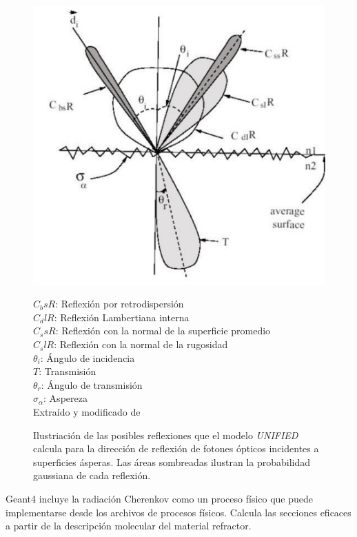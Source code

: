 \documentclass{book}
\begin{document}
\begin{figure}[h] %
\begin{center}
 \includegraphics[width = 0.5\linewidth]{UNIFIED.png}
 
 $C_bsR$: Reflexi\'on por retrodispersi\'on\\
 $C_dlR$: Reflexi\'on Lambertiana interna\\
 $C_ssR$: Reflexi\'on con la normal de la superficie promedio\\
 $C_slR$: Reflexi\'on con la normal de la rugosidad\\
 $\theta_i$: \'Angulo de incidencia\\
 $T$: Transmisi\'on\\
 $\theta_r$: \'Angulo de transmisi\'on\\
 $\sigma_\alpha$: Aspereza\\
 Extra\'ido y modificado de \citep{GUMP}
\caption{Ilustriaci\'on de las posibles reflexiones que el modelo \textit{UNIFIED} calcula para la direcci\'on de reflexi\'on de fotones \'opticos incidentes a superficies \'asperas. Las \'areas sombreadas ilustran la probabilidad gaussiana de cada reflexi\'on.}
\end{center}
\end{figure}

Geant4 incluye la radiaci\'on Cherenkov como un proceso f\'isico que puede implementarse desde los archivos de procesos f\'isicos. Calcula las secciones eficaces a partir de la descripci\'on molecular del material refractor. 


\end{document}

